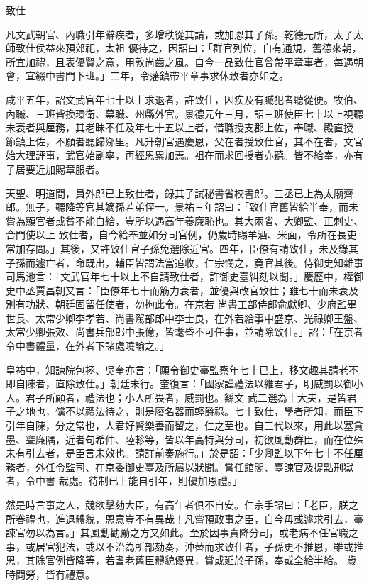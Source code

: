 \begin{pinyinscope}
 致仕



 凡文武朝官、內職引年辭疾者，多增秩從其請，或加恩其子孫。乾德元所，太子太師致仕侯益來預郊祀，太祖
 優待之，因詔曰：「群官列位，自有通規，舊德來朝，所宜加禮，且表優賢之意，用敦尚齒之風。自今一品致仕官曾帶平章事者，每遇朝會，宜綴中書門下班。」二年，令藩鎮帶平章事求休致者亦如之。



 咸平五年，詔文武官年七十以上求退者，許致仕，因疾及有贓犯者聽從便。牧伯、內職、三班皆換環衛、幕職、州縣外官。景德元年三月，詔三班使臣七十以上視聽未衰者與厘務，其老昧不任及年七十五以上者，借職授支郡上佐，奉職、殿直授
 節鎮上佐，不願者聽歸鄉里。凡升朝官遇慶恩，父在者授致仕官，其不在者，文官始大理評事，武官始副率，再經恩累加焉。祖在而求回授者亦聽。皆不給奉，亦有子居要近加賜章服者。



 天聖、明道間，員外郎已上致仕者，錄其子試秘書省校書郎。三丞已上為太廟齊郎。無子，聽降等官其嫡孫若弟侄一。景祐三年詔曰：「致仕官舊皆給半奉，而未嘗為顯官者或貧不能自給，豈所以遇高年養廉恥也。其大兩省、大卿監、正刺史、合門使以上
 致仕者，自今給奉並如分司官例，仍歲時賜羊酒、米面，令所在長吏常加存問。」其後，又許致仕官子孫免選除近官。四年，臣僚有請致仕，未及錄其子孫而遽亡者，命既出，輔臣皆謂法當追收，仁宗憫之，竟官其後。侍御史知雜事司馬池言：「文武官年七十以上不自請致仕者，許御史臺糾劾以聞。」慶歷中，權御史中丞賈昌朝又言：「臣僚年七十而筋力衰者，並優與改官致仕；雖七十而未衰及別有功狀、朝廷固留任使者，勿拘此令。在京若
 尚書工部侍郎俞獻卿、少府監畢世長、太常少卿李孝若、尚書駕部郎中李士良，在外若給事中盛京、光祿卿王盤、太常少卿張效、尚書兵部郎中張億，皆耄昏不可任事，並請除致仕。」詔：「在京者令中書體量，在外者下諸處曉諭之。」



 皇祐中，知諫院包拯、吳奎亦言：「願令御史臺監察年七十已上，移文趣其請老不即自陳者，直除致仕。」朝廷未行。奎復言：「國家謹禮法以維君子，明威罰以御小人。君子所顧者，禮法也；小人所畏者，威罰也。繇文
 武二選為士大夫，是皆君子之地也，儻不以禮法待之，則是廢名器而輕爵祿。七十致仕，學者所知，而臣下引年自陳，分之常也，人君好賢樂善而留之，仁之至也。自三代以來，用此以塞貪墨、聳廉隅，近者句希仲、陸軫等，皆以年高特與分司，初欲風動群臣，而在位殊未有引去者，是臣言未效也。請詳前奏施行。」於是詔：「少卿監以下年七十不任厘務者，外任令監司、在京委御史臺及所屬以狀聞。嘗任館閣、臺諫官及提點刑獄者，令中書
 裁處。待制已上能自引年，則優加恩禮。」



 然是時言事之人，競欲擊劾大臣，有高年者俱不自安。仁宗手詔曰：「老臣，朕之所眷禮也，進退體貌，恩意豈不有異哉！凡嘗預政事之臣，自今毋或遽求引去，臺諫官勿以為言。」其風動勸勵之方又如此。至於因事責降分司，或老病不任官職之事，或居官犯法，或以不治為所部劾奏，沖替而求致仕者，子孫更不推恩，雖或推恩，其除官例皆降等，若耆老舊臣體貌優異，賞或延於子孫，奉或全給半給。
 歲時問勞，皆有禮意。




\end{pinyinscope}
